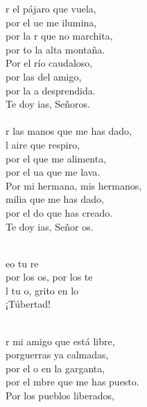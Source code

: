 \begin{cancion}%
	r el pájaro que vuela, \\
	por el ue me ilumina,\\
	por la r que no marchita, \\
	por to la alta montaña.\\
Por el río caudaloso, \\
	por las  del amigo,\\
	por la a desprendida.\\
	Te doy ias, Señoros.\\
\jump\\
	r las manos que me has dado,\\
	l aire que respiro,\\
	por el  que me alimenta, \\
	por el ua que me lava.\\
Por mi hermana, mis hermanos, \\
	milia que me has dado, \\
	por el do que has creado. \\
	Te doy ias, Señor os.\\\jump\\
	\begin{chorus}%
	eo tu re\\
	por los os, por los te  \\
	l tu o, grito en lo \\
	¡Túbertad! \\
	\end{chorus}%
	\jump\\
	r mi amigo que está libre, \\
	porguerras ya calmadas, \\
	por el o en la garganta, \\
	por el mbre que me has puesto. \\
Por los pueblos liberados, \\

\end{cancion}
